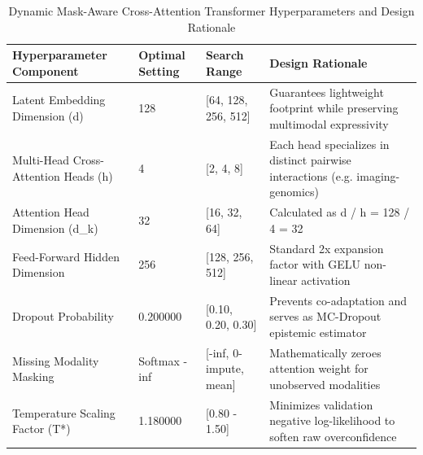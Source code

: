 \begin{table}
\caption{Dynamic Mask-Aware Cross-Attention Transformer Hyperparameters and Design Rationale}
\label{tab:table_6_01_06_dynamic_mask_aware_cross_attention_hyperparameters}
\begin{tabular}{llll}
\toprule
Hyperparameter Component & Optimal Setting & Search Range & Design Rationale \\
\midrule
Latent Embedding Dimension (d) & 128 & [64, 128, 256, 512] & Guarantees lightweight footprint while preserving multimodal expressivity \\
Multi-Head Cross-Attention Heads (h) & 4 & [2, 4, 8] & Each head specializes in distinct pairwise interactions (e.g. imaging-genomics) \\
Attention Head Dimension (d_k) & 32 & [16, 32, 64] & Calculated as d / h = 128 / 4 = 32 \\
Feed-Forward Hidden Dimension & 256 & [128, 256, 512] & Standard 2x expansion factor with GELU non-linear activation \\
Dropout Probability & 0.200000 & [0.10, 0.20, 0.30] & Prevents co-adaptation and serves as MC-Dropout epistemic estimator \\
Missing Modality Masking & Softmax -inf & [-inf, 0-impute, mean] & Mathematically zeroes attention weight for unobserved modalities \\
Temperature Scaling Factor (T*) & 1.180000 & [0.80 - 1.50] & Minimizes validation negative log-likelihood to soften raw overconfidence \\
\bottomrule
\end{tabular}
\end{table}
